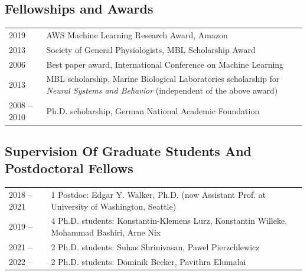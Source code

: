 \documentclass[COG,11pt]{ercgrant}
\begin{document}
\subsection{Fellowships and Awards}
\begin{tabular}{p{3cm}p{12cm}}
2019 & AWS Machine Learning Research Award, Amazon\\
2013 & Society of General Physiologists, MBL Scholarship Award\\
2006 & Best paper award, International Conference on Machine Learning\\
2013 & MBL scholarship, Marine Biological Laboratories
  scholarship for {\em Neural Systems and Behavior} (independent of the above award)\\
2008 -- 2010 & Ph.D. scholarship, German National Academic Foundation
\end{tabular}

\subsection{Supervision Of Graduate Students And Postdoctoral Fellows}
\begin{tabular}{p{3cm}p{12cm}}
2018 -- 2021 & 1 Postdoc: Edgar Y. Walker, Ph.D. (now Assistant Prof. at University of Washington, Seattle)\\
2019 -- & 4 Ph.D. students: Konstantin-Klemens Lurz, Konstantin Willeke, Mohammad Bashiri, Arne Nix\\
2021 -- & 2 Ph.D. students: Suhas Shrinivasan, Pawel Pierzchlewicz\\
2022 -- & 2 Ph.D. students: Dominik Becker, Pavithra Elumalai
\end{tabular}
\end{document}
